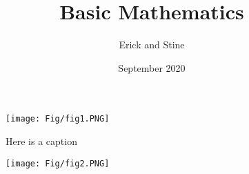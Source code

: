 \documentclass{article}
\title{Basic Mathematics}
\author{Erick and Stine}
\date{September 2020}
\begin{document}
\maketitle
\listoffigures
\listoftables
\blindtext

\begin{wrapfigure}{l}{0.5\textwidth}%
\texttt{[image: Fig/fig1.PNG]}
\caption{Here is a caption}
\end{wrapfigure}

\begin{figure}[b]
\raggedright
\texttt{[image: Fig/fig2.PNG]}
\end{figure}
\end{document}
